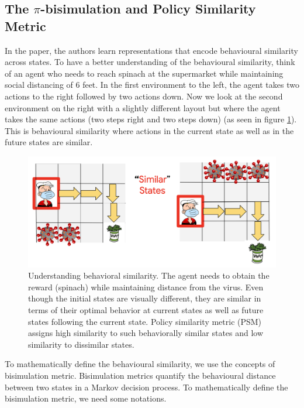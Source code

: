 \documentclass{usiinftr}
\begin{document}
\subsection{The $\pi$-bisimulation and Policy Similarity Metric} \label{sec: PSM}
In the paper, the authors learn representations that encode behavioural similarity across states. To have a better understanding of the behavioural similarity, think of an agent who needs to reach spinach at the supermarket while maintaining social distancing of 6 feet. In the first environment to the left, the agent takes two actions to the right followed by two actions down. Now we look at the second environment on the right with a slightly different layout but where the agent takes the same actions (two steps right and two steps down) (as seen in figure \ref{fig:BehavioralSimilarity}). This is behavioural similarity where actions in the current state as well as in the future states are similar.

\begin{figure}[h]
    \centering
    \includegraphics[width = 0.6\linewidth]{figures/image3.png}
    \caption{Understanding behavioral similarity. The agent needs to obtain the reward (spinach) while maintaining distance from the virus. Even though the initial states are visually different, they are similar in terms of their optimal behavior at current states as well as future states following the current state. Policy similarity metric (PSM) assigns high similarity to such behaviorally similar states and low similarity to dissimilar states.\cite{github_contrastive_similarity} }
    \label{fig:BehavioralSimilarity}
\end{figure}

To mathematically define the behavioural similarity, we use the concepts of bisimulation metric. Bisimulation metrics quantify the behavioural distance between two states in a Markov decision process. To mathematically define the bisimulation metric, we need some notations.
\end{document}

